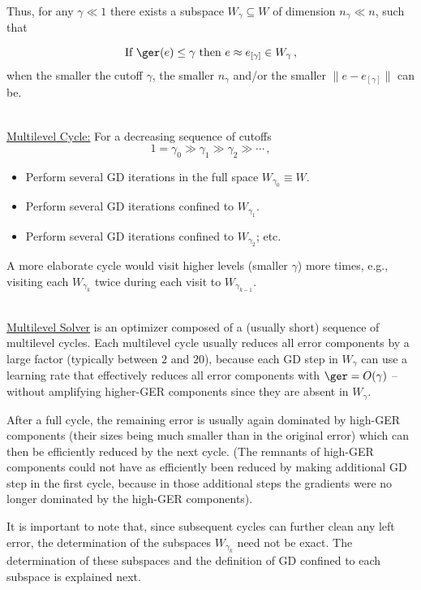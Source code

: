 \documentclass{article} %
\begin{document}
Thus, for any $\gamma \ll 1$ there exists a subspace $W_{\gamma} \subseteq W$ of dimension $n_{\gamma} \ll n$, such that

\begin{equation}
	{\mbox{If }} \ger(e) \leq \gamma {\mbox{ then }} e \approx e_{[\gamma]} \in W_{\gamma}\,,
	\label{ger_gamma}
\end{equation}
when the smaller the cutoff $\gamma$, the smaller $n_{\gamma}$ and/or the smaller $\|e -e_{[\gamma]}\|$ can be.

{\mbox{}}\\ \noindent
\underline{Multilevel Cycle:} For a decreasing sequence of cutoffs
$$
1 = \gamma_0 \gg \gamma_1 \gg \gamma_2 \gg \cdots\,,
$$
\begin{itemize}
	\item Perform several GD iterations in the full space $W_{\gamma_0} \equiv W$.
	\item Perform several GD iterations confined to $W_{\gamma_1}$.
	\item Perform several GD iterations confined to $W_{\gamma_2}$; etc.
\end{itemize}
A more elaborate cycle would visit higher levels (smaller $\gamma$) more times, e.g., visiting each $W_{\gamma_k}$ twice during each visit to $W_{\gamma_{k-1}}$.

{\mbox{}}\\
\underline{Multilevel Solver} is an optimizer composed of a (usually short) sequence of multilevel cycles. Each multilevel cycle usually reduces all error components by a large factor (typically between $2$ and $20$), because each  GD step in $W_{\gamma}$ can use a learning rate that effectively reduces all error components with $\ger = O(\gamma)$ -- without amplifying higher-GER components since they are absent in $W_{\gamma}$.

After a full cycle, the remaining error is usually again dominated by high-GER components (their sizes being much smaller than in the original error) which can then be efficiently reduced by the next cycle. (The remnants of high-GER components could not have as efficiently been reduced by making additional GD step in the first cycle, because in those additional steps the gradients were no longer dominated by the high-GER components).

It is important to note that, since subsequent cycles can further clean any left error, the determination of the subspaces $W_{\gamma_k}$ need not be exact. The determination of these subspaces and the definition of GD confined to each subspace is explained next.
\end{document}
